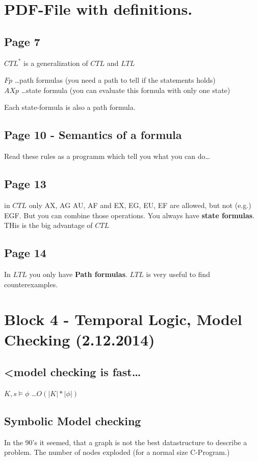 \documentclass[a4paper]{article}
\newcommand{\entails}[1]{\models{#1}}
\begin{document}
\section{PDF-File with definitions.}
\subsection{Page 7}

$CTL^*$ is a generalization of $CTL$ and $LTL$

$Fp$ \ldots path formulas (you need a path to tell if the statements holds)\\
$AXp$ \ldots state formula (you can evaluate this formula with only one state)

Each state-formula is also a path formula.

\subsection{Page 10 - Semantics of a formula}

Read these rules as a programm which tell you what you can do\ldots

\subsection{Page 13}
in $CTL$ only AX, AG AU, AF and EX, EG, EU, EF are allowed, but not (e.g.) EGF.
But you can combine those operations. You always have \textbf{state formulas}.
THis is the big advantage of $CTL$


\subsection{Page 14}

In $LTL$ you only have \textbf{Path formulas}. $LTL$ is very useful to find
counterexamples.

 
\section{Block 4 - Temporal Logic, Model Checking (2.12.2014)}

\subsection{<model checking is fast\ldots}
$K, s \entails{} \phi $ \ldots $O(|K|*|\phi |)$

\subsection{Symbolic Model checking}
In the 90's it seemed, that a graph is not the best datastructure to describe a
problem. The number of nodes exploded (for a normal size C-Program.)
\end{document}

